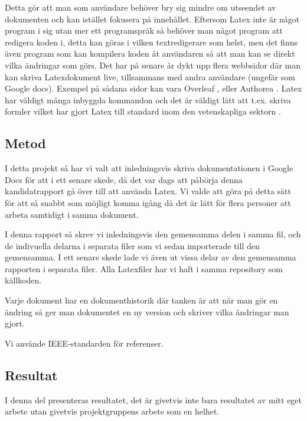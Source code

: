 	
Detta gör att man som användare behöver bry sig mindre om utseendet av dokumenten och kan istället fokusera på innehållet. Eftersom Latex inte är något program i sig utan mer ett programspråk så behöver man något program att redigera koden i, detta kan göras i vilken textredigerare som helst, men det finns även program som kan kompilera koden åt användaren så att man kan se direkt vilka ändringar som görs. Det har på senare år dykt upp flera webbsidor där man kan skriva Latexdokument live, tillsammans med andra användare (ungefär som Google docs). Exempel på sådana sidor kan vara Overleaf \cite{overleaf}, eller Authorea \cite{authorea}. Latex har väldigt många inbyggda kommandon och det är väldigt lätt att t.ex. skriva formler vilket har gjort Latex till standard inom den vetenskapliga sektorn \cite{latex_standard}.


\subsection{Metod}
I detta projekt så har vi valt att inledningsvis skriva dokumentationen i Google Docs för att i ett senare skede, då det var dags att påbörja denna kandidatrapport gå över till att använda Latex. Vi valde att göra på detta sätt för att så snabbt som möjligt komma igång då det är lätt  för flera personer att arbeta samtidigt i samma dokument.

I denna rapport så skrev vi inledningsvis den gemensamma delen i samma fil, och de indivuella delarna i separata filer som vi sedan importerade till den gemensamma. I ett senare skede lade vi även ut vissa delar av den gemensamma rapporten i separata filer. Alla Latexfiler har vi haft i samma repository som källkoden.

Varje dokument har en dokumenthistorik där tanken är att när man gör en ändring så ger man dokumentet en ny version och skriver vilka ändringar man gjort.

Vi använde IEEE-standarden för referenser.

\subsection{Resultat}
I denna del presenteras resultatet, det är givetvis inte bara resultatet av mitt eget arbete utan givetvis projektgruppens arbete som en helhet.

